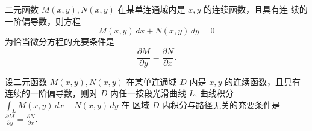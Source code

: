 \begin{theorem}[恰当微分方程的判定定理]\label{thm:exact_DE_criterion}
二元函数 $M(x,y), N(x,y)$ 在某单连通域内是 $x,y$ 的连续函数，且具有连
续的一阶偏导数，则方程
$$M(x,y)\,dx+N(x,y)\,dy=0$$
为恰当微分方程的充要条件是
$$\frac{\partial M}{\partial y} = \frac{\partial N}{\partial x}.$$
\end{theorem}

\begin{proposition}[曲线积分的性质]\label{prop:path_independence}
设二元函数 $M(x,y), N(x,y)$ 在某单连通域 $D$ 内是 $x,y$ 的连续函数，且具有
连续的一阶偏导数，则对 $D$ 内任一按段光滑曲线 $L$, 曲线积分 $\int_L M(x,y)\,dx + N(x,y)\,dy$ 在
区域 $D$ 内积分与路径无关的充要条件是 $\frac{\partial M}{\partial y} = \frac{\partial N}{\partial x}$.
\end{proposition}

